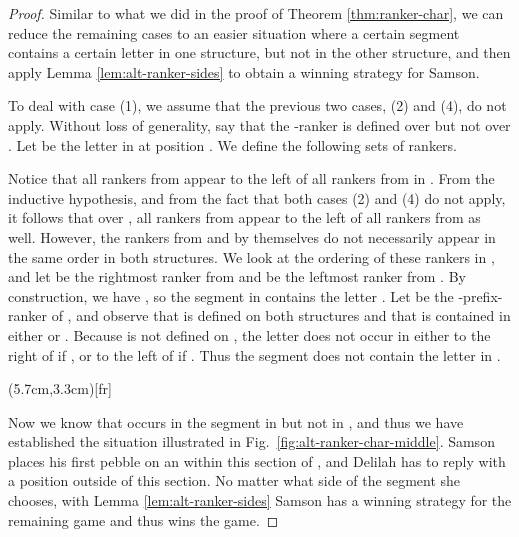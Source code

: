 \documentclass{LMCS}
\begin{document}
\begin{full}
\begin{proof}
  Similar to what we did in the proof of Theorem \ref{thm:ranker-char}, we
  can reduce the remaining cases to an easier situation where a certain
  segment contains a certain letter in one structure, but not in the other
  structure, and then apply Lemma \ref{lem:alt-ranker-sides} to obtain a
  winning strategy for Samson.\pagebreak[2]

  To deal with case (1), we assume that the previous two cases, (2) and (4),
  do not apply. Without loss of generality, say that the -ranker  is
  defined over  but not over . Let  be the
  letter in  at position . We define the following sets of rankers.
  
  Notice that all rankers from  appear to the left of all rankers
  from  in . From the inductive hypothesis, and from the fact that
  both cases (2) and (4) do not apply, it follows that over , all rankers
  from  appear to the left of all rankers from  as well.
  However, the rankers from  and  by themselves do
  not necessarily appear in the same order in both structures. We look at
  the ordering of these rankers in , and let  be the rightmost
  ranker from  and  be the leftmost ranker from .
  By construction, we have , so
  the segment  in  contains the letter . Let
   be the -prefix-ranker of , and observe that  is defined
  on both structures and that  is contained in either  or
  . Because  is not defined on , the letter  does not
  occur in  either to the right of  if , 
  or to the left of
   if . Thus the segment  does not contain the
  letter  in .

  \parpic(5.7cm,3.3cm)[fr]{
  }

  Now we know that  occurs in the segment  in 
  but not in , and thus we have established the situation illustrated in
  Fig.~\ref{fig:alt-ranker-char-middle}. Samson places his first pebble on
  an  within this section of , and Delilah has to reply with
  a position outside of this section. No matter what side of the segment
  she chooses, with Lemma \ref{lem:alt-ranker-sides} Samson has a winning
  strategy for the remaining game and thus wins the  game.
  

\end{proof}
\end{full}
\end{document}
